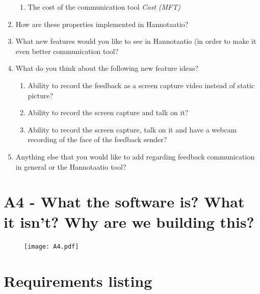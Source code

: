 \documentclass[english,12pt,a4paper,pdftex]{article}
\newenvironment{wide}{%
  \begin{list}{}{%
      \setlength{\topsep}{0pt}%
      \addtolength{\leftmargin}{-2cm}%
      \addtolength{\rightmargin}{-2cm}%
      \setlength{\listparindent}{\parindent}%
      \setlength{\itemindent}{\parindent}%
      \setlength{\parsep}{\parskip}}%
  \item[]%
}{%
  \end{list}%
}
\begin{document}
\begin{enumerate}
\begin{enumerate}
    \item The cost of the communication tool \emph{Cost (MFT)}
    
  \end{enumerate}

\item How are these properties implemented in Hannotaatio?

\item What new features would you like to see in Hannotaatio (in order to make it even better communication tool?

\item What do you think about the following new feature ideas?

  \begin{enumerate}
    \item Ability to record the feedback as a screen capture video instead of static picture?
    \item Ability to record the screen capture and talk on it?
    \item Ability to record the screen capture, talk on it and have a webcam recording of the face of the feedback sender?
  \end{enumerate}

\item Anything else that you would like to add regarding feedback communication in general or the Hannotaatio tool?
  
\end{enumerate}

\clearpage

\section{A4 - What the software is? What it isn't? Why are we building this?}
\label{appendix:a4}

\begin{wide}
\begin{figure}[htb]
\begin{center}
\texttt{[image: A4.pdf]}
\end{center}
\end{figure}
\end{wide}

\clearpage

\section{Requirements listing}
\label{appendix:requirements}
\end{document}
